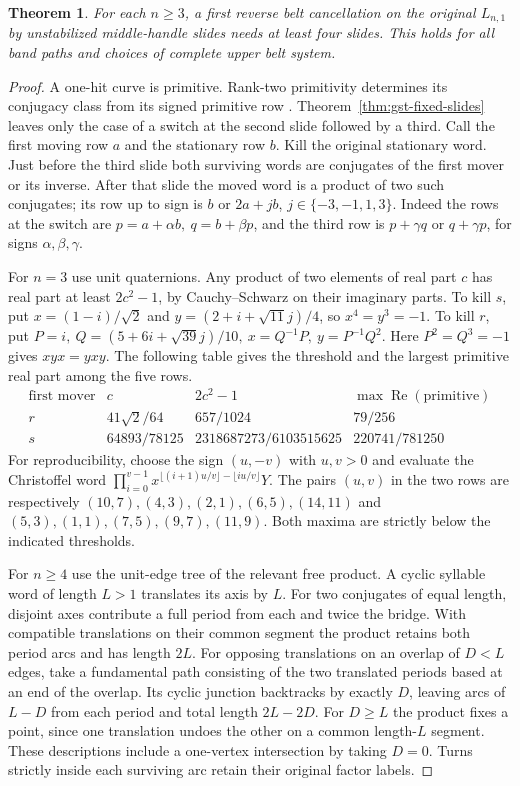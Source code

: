 \documentclass[11pt,letterpaper]{article}
\numberwithin{equation}{section}
\newtheorem{theorem}{Theorem}[section]
\theoremstyle{remark}
\begin{document}
\begin{theorem}\label{thm:gst-three}
For each \(n\ge3\), a first reverse belt cancellation on the original
\(L_{n,1}\) by unstabilized middle-handle slides needs at least four
slides. This holds for all band paths and choices of complete upper
belt system.
\end{theorem}
\begin{proof}
A one-hit curve is primitive. Rank-two primitivity determines its
conjugacy class from its signed primitive row
\cite[\S3, Corollary 3.3(b)]{KasselReutenauer2007}.
Theorem~\ref{thm:gst-fixed-slides} leaves only the case of a switch at
the second slide followed by a third. Call the first moving row \(a\)
and the stationary row \(b\). Kill the original stationary word.
Just before the third slide both surviving words are conjugates of
the first mover or its inverse. After that slide the moved word is a
product of two such conjugates; its row up to sign is \(b\) or
\(2a+j b\), \(j\in\{-3,-1,1,3\}\). Indeed the rows at the switch
are \(p=a+\alpha b,\ q=b+\beta p\), and the third row is
\(p+\gamma q\) or \(q+\gamma p\), for signs \(\alpha,\beta,\gamma\).

For \(n=3\) use unit quaternions. Any product of two elements of real
part \(c\) has real part at least \(2c^2-1\), by Cauchy--Schwarz on
their imaginary parts. To kill \(s\), put \(x=(1-i)/\sqrt2\) and
\(y=(2+i+\sqrt{11}j)/4\), so \(x^4=y^3=-1\). To kill \(r\), put
\(P=i,\ Q=(5+6i+\sqrt{39}j)/10,\ x=Q^{-1}P,\ y=P^{-1}Q^2\).
Here \(P^2=Q^3=-1\) gives \(xyx=yxy\). The following table gives
the threshold and the largest primitive real part among the five rows.
\[
\begin{array}{c|c|c|c}
\text{first mover}&c&2c^2-1&\max\operatorname{Re}(\text{primitive})\\ \hline
r&41\sqrt2/64&657/1024&79/256\\
s&64893/78125&2318687273/6103515625&220741/781250
\end{array}
\]
For reproducibility, choose the sign \((u,-v)\) with \(u,v>0\)
and evaluate the Christoffel word
\(\prod_{i=0}^{v-1}x^{\lfloor(i+1)u/v\rfloor-\lfloor iu/v\rfloor}Y\).
The pairs \((u,v)\) in the two rows are respectively
\((10,7),(4,3),(2,1),(6,5),(14,11)\) and
\((5,3),(1,1),(7,5),(9,7),(11,9)\).
Both maxima are strictly below the indicated thresholds.

For \(n\ge4\) use the unit-edge tree of the relevant free product.
A cyclic syllable word of length \(L>1\) translates its axis by
\(L\). For two conjugates of equal length, disjoint axes contribute
a full period from each and twice the bridge. With compatible
translations on their common segment the product retains both
period arcs and has length \(2L\). For opposing translations on an
overlap of \(D<L\) edges, take a fundamental path consisting of the
two translated periods based at an end of the overlap. Its cyclic
junction backtracks by exactly \(D\), leaving arcs of \(L-D\) from
each period and total length \(2L-2D\). For \(D\ge L\) the product
fixes a point, since one translation undoes the other on a common
length-\(L\) segment. These descriptions include a one-vertex
intersection by taking \(D=0\). Turns strictly inside each surviving
arc retain their original factor labels.


\end{proof}
\end{document}
